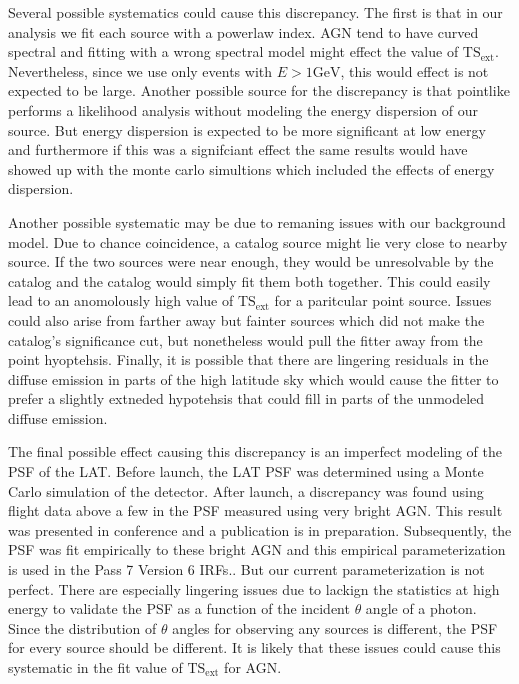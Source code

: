\documentclass[preprint]{aastex}
\newcommand{\gev}{\text{GeV}\xspace}
\newcommand{\tsext}{\ensuremath{\text{TS}_\text{ext}}\xspace}
\begin{document}
Several possible systematics could cause this discrepancy. The first
is that in our analysis we fit each source with a powerlaw index.
AGN tend to have curved spectral and fitting with a wrong spectral
model might effect the value of \tsext. Nevertheless, since we use only
events with $E>1\gev$, this would effect is not expected to be large.
Another possible source for the discrepancy is that pointlike performs a
likelihood analysis without modeling the energy dispersion of our source.
But energy dispersion is expected to be more significant at low
energy and furthermore if this was a signifciant effect the same results
would have showed up with the monte carlo simultions which included the
effects of energy dispersion. 

Another possible systematic may be due to remaning issues with our
background model. Due to chance coincidence, a catalog source might
lie very close to nearby source. If the two sources were near enough,
they would be unresolvable by the catalog and the catalog would simply
fit them both together.  This could easily lead to an anomolously high
value of \tsext for a paritcular point source. Issues could also arise
from farther away but fainter sources which did not make the catalog's
significance cut, but nonetheless would pull the fitter away from the
point hyoptehsis.  Finally, it is possible that there are lingering
residuals in the diffuse emission in parts of the high latitude sky
which would cause the fitter to prefer a slightly extneded hypotehsis
that could fill in parts of the unmodeled diffuse emission.

The final possible effect causing this discrepancy is an imperfect
modeling of the PSF of the LAT.  Before launch, the LAT PSF
was determined using a Monte Carlo simulation of the detector.
After launch, a discrepancy was found using flight data above a
few \gev in the PSF measured using very bright AGN.  This result
was presented in conference and a publication is in preparation.
Subsequently, the PSF was fit empirically to these bright AGN and this
empirical parameterization is used in the Pass 7 Version 6 IRFs.\cite{
https://confluence.slac.stanford.edu/download/attachments/102860834/FermiSymp2011_CAPSF_v5_ROTH.pptx
}. But our current parameterization is not perfect. There are especially
lingering issues due to lackign the statistics at high energy to
validate the PSF as a function of the incident $\theta$ angle of a
photon. Since the distribution of $\theta$ angles for observing any
sources is different, the PSF for every source should be different.
It is likely that these issues could cause this systematic in the fit
value of \tsext for AGN.
\end{document}
